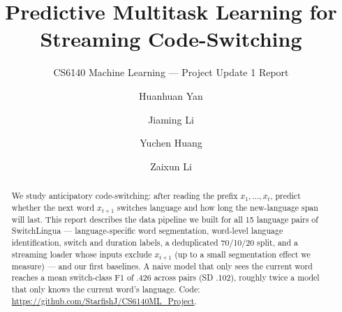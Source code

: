 \documentclass[sigconf]{acmart}
\begin{document}
\title{Predictive Multitask Learning for Streaming Code-Switching}
\subtitle{CS6140 Machine Learning --- Project Update 1 Report}
\author{Huanhuan Yan}
\author{Jiaming Li}
\author{Yuchen Huang}
\author{Zaixun Li}
\renewcommand{\shortauthors}{Yan et al.}
\begin{abstract}
We study anticipatory code-switching: after reading the prefix $x_1,\dots,x_t$, predict whether the next word
$x_{t+1}$ switches language and how long the new-language span will last. This report describes the data pipeline
we built for all 15 language pairs of SwitchLingua --- language-specific word segmentation, word-level language
identification, switch and duration labels, a deduplicated 70/10/20 split, and a streaming loader whose inputs
exclude $x_{t+1}$ (up to a small segmentation effect we measure) --- and our first baselines. A naive model that only sees the current word reaches a mean
switch-class F1 of .426 across pairs (SD .102), roughly twice a model that only knows the
current word's language. Code: \url{https://github.com/StarfishJ/CS6140ML_Project}.
\end{abstract}
\maketitle
\pagestyle{plain}
\end{document}
